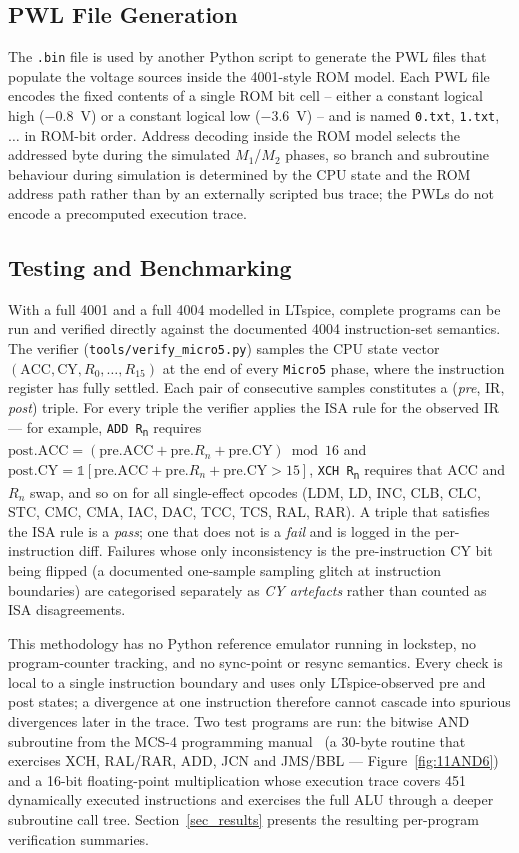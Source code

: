 \subsection{PWL File Generation}
The \texttt{.bin} file is used by another Python script to generate the PWL files that populate the voltage sources inside the 4001-style ROM model. Each PWL file encodes the fixed contents of a single ROM bit cell -- either a constant logical high ($-0.8$~V) or a constant logical low ($-3.6$~V) -- and is named \texttt{0.txt}, \texttt{1.txt}, $\ldots$ in ROM-bit order. Address decoding inside the ROM model selects the addressed byte during the simulated $M_1$/$M_2$ phases, so branch and subroutine behaviour during simulation is determined by the CPU state and the ROM address path rather than by an externally scripted bus trace; the PWLs do not encode a precomputed execution trace.

\subsection{Testing and Benchmarking}
With a full 4001 and a full 4004 modelled in LTspice, complete programs can be run and verified directly against the documented 4004 instruction-set semantics. The verifier (\texttt{tools/verify\_micro5.py}) samples the CPU state vector $(\mathrm{ACC}, \mathrm{CY}, R_0, \ldots, R_{15})$ at the end of every \texttt{Micro5} phase, where the instruction register has fully settled. Each pair of consecutive samples constitutes a (\emph{pre}, IR, \emph{post}) triple. For every triple the verifier applies the ISA rule for the observed IR --- for example, \texttt{ADD~R\textsubscript{n}} requires $\mathrm{post.ACC} = (\mathrm{pre.ACC} + \mathrm{pre.}R_n + \mathrm{pre.CY}) \bmod 16$ and $\mathrm{post.CY} = \mathbb{1}[\mathrm{pre.ACC} + \mathrm{pre.}R_n + \mathrm{pre.CY} > 15]$, \texttt{XCH~R\textsubscript{n}} requires that $\mathrm{ACC}$ and $R_n$ swap, and so on for all single-effect opcodes (LDM, LD, INC, CLB, CLC, STC, CMC, CMA, IAC, DAC, TCC, TCS, RAL, RAR). A triple that satisfies the ISA rule is a \emph{pass}; one that does not is a \emph{fail} and is logged in the per-instruction diff. Failures whose only inconsistency is the pre-instruction CY bit being flipped (a documented one-sample sampling glitch at instruction boundaries) are categorised separately as \emph{CY artefacts} rather than counted as ISA disagreements.

This methodology has no Python reference emulator running in lockstep, no program-counter tracking, and no sync-point or resync semantics. Every check is local to a single instruction boundary and uses only LTspice-observed pre and post states; a divergence at one instruction therefore cannot cascade into spurious divergences later in the trace. Two test programs are run: the bitwise AND subroutine from the MCS-4 programming manual~\cite{Intel1973MCS4} (a 30-byte routine that exercises XCH, RAL/RAR, ADD, JCN and JMS/BBL --- Figure~\ref{fig:11AND6}) and a 16-bit floating-point multiplication whose execution trace covers 451 dynamically executed instructions and exercises the full ALU through a deeper subroutine call tree. Section~\ref{sec_results} presents the resulting per-program verification summaries.

